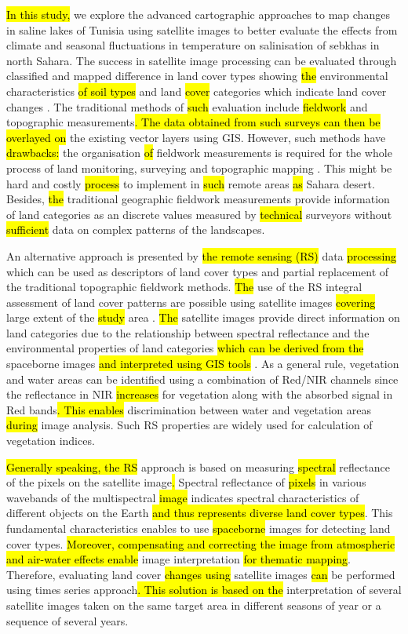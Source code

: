 \documentclass[land,article,submit,pdftex,moreauthors]{Definitions/mdpi}
\begin{document}
\hl{In this study,} we explore the advanced cartographic approaches to map changes in saline lakes of Tunisia using satellite images to better evaluate the effects from climate and seasonal fluctuations in temperature on salinisation of sebkhas in north Sahara. The success in satellite image processing can be evaluated through classified and mapped difference in land cover types showing \hl{the }environmental characteristics \hl{of soil types} and land \hl{cover }categories which indicate land cover changes \cite{Shoshany}. The traditional methods of \hl{such }evaluation include \hl{fieldwork} and topographic measurements\hl{. The data obtained from such surveys can then be overlayed on} the existing vector layers using GIS. However, such methods have\hl{ drawbacks: }the organisation \hl{of} fieldwork measurements is required for the whole process of land monitoring, surveying and topographic mapping \cite{JENDOUBI2020100507}. This might be hard and costly \hl{process }to implement in \hl{such} remote areas \hl{as} Sahara desert. Besides, \hl{the }traditional geographic fieldwork measurements provide information of land categories as an discrete values measured by  \hl{technical} surveyors without \hl{sufficient }data on complex patterns of the landscapes. 

An alternative approach is presented by \hl{the remote sensing (RS)} data \hl{processing} which can be used as descriptors of land cover types and partial replacement of the traditional topographic fieldwork methods. \hl{The }use of the RS integral assessment of land cover patterns are possible using satellite images \hl{covering} large extent of the \hl{study} area \cite{ELGHOUL2023106733}. \hl{The} satellite images provide direct information on land categories due to the relationship between spectral reflectance and the environmental properties of land categories \hl{which can be derived from the} spaceborne images \hl{and interpreted using GIS tools} \cite{Allouche,Ruiz,Ray}. As a general rule, vegetation and water areas can be identified using a combination of Red/NIR channels since the reflectance in NIR \hl{increases} for vegetation along with the absorbed signal in Red bands\hl{. This enables} discrimination between water and vegetation areas \hl{during} image analysis. Such RS properties are widely used for calculation of vegetation indices. 

\hl{Generally speaking, the RS} approach is based on measuring \hl{spectral} reflectance of the pixels on the satellite image\hl{. }Spectral reflectance of \hl{pixels} in various wavebands of the multispectral \hl{image }indicates spectral characteristics of different objects on the Earth \hl{and thus represents diverse land cover types}. This fundamental characteristics enables to use \hl{spaceborne }images for detecting land cover types. \hl{Moreover, compensating and correcting the image from atmospheric and air-water effects enable }image interpretation \hl{for thematic mapping}. Therefore, evaluating land cover \hl{changes using} satellite images\hl{ can} be performed using times series approach\hl{. This solution is based on the} interpretation of several satellite images taken on the same target area in different seasons of year or a sequence of several years. 
\end{document}
